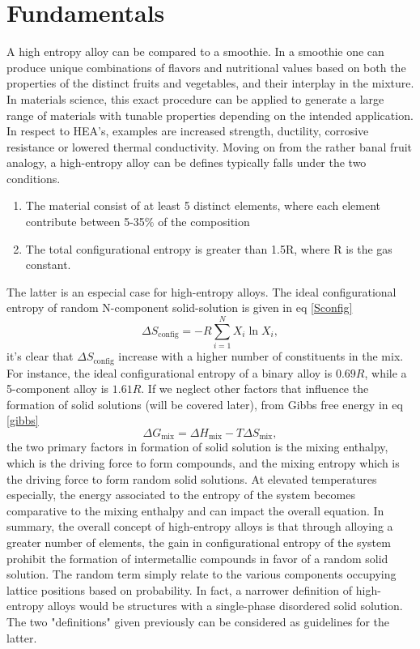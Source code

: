 \section{Fundamentals} 
A high entropy alloy can be compared to a smoothie. In a smoothie one can produce unique combinations of flavors and nutritional values based on both the properties of the distinct fruits and vegetables, and their interplay in the mixture. In materials science, this exact procedure can be applied to generate a large range of materials with tunable properties depending on the intended application. In respect to HEA's, examples are increased strength, ductility, corrosive resistance or lowered thermal conductivity. 
Moving on from the rather banal fruit analogy, a high-entropy alloy can be defines  typically falls under the two conditions.
\begin{enumerate}
    \item The material consist of at least 5 distinct elements, where each element contribute between 5-35$\%$ of the composition
    \item The total configurational entropy is greater than 1.5R, where R is the gas constant. 
\end{enumerate}
The latter is an especial case for high-entropy alloys. The ideal configurational entropy of random N-component solid-solution is given in eq \ref{Sconfig}
\begin{equation}
\Delta S_{\text{config}} = -R \sum_{i=1}^{N}X_i\ln X_i, \label{Sconfig}
\end{equation}
 it's clear that $\Delta S_{\text{config}}$ increase with a higher number of constituents in the mix. For instance, the ideal configurational entropy of a binary alloy is $0.69R$, while a 5-component alloy is $1.61R$. If we neglect other factors that influence the formation of solid solutions (will be covered later), from Gibbs free energy in eq \ref{gibbs}
\begin{equation}
\Delta G_{\text{mix}} = \Delta H_{\text{mix}} - T\Delta S_{\text{mix}}, \label{gibbs}
\end{equation} 
the two primary factors in formation of solid solution is the mixing enthalpy, which is the driving force to form compounds, and the mixing entropy which is the driving force to form random solid solutions. At elevated temperatures especially, the energy associated to the entropy of the system becomes comparative to the mixing enthalpy and can impact the overall equation. In summary, the overall concept of high-entropy alloys is that through alloying a greater number of elements, the gain in configurational entropy of the system prohibit the formation of intermetallic compounds in favor of a random solid solution. The random term simply relate to the various components occupying lattice positions based on probability. In fact, a narrower definition of high-entropy alloys would be structures with a single-phase disordered solid solution. The two "definitions" given previously can be considered as guidelines for the latter.
 
